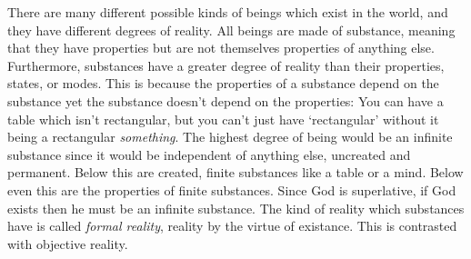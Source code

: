 There are many different possible kinds of beings which exist in the world, and they have different degrees of reality. All beings are made of substance, meaning that they have properties but are not themselves properties of anything else.  Furthermore, substances have a greater degree of reality than their properties, states, or modes. This is because the properties of a substance depend on the substance yet the substance doesn't depend on the properties: You can have a table which isn't rectangular, but you can't just have `rectangular' without it being a rectangular \emph{something}. The highest degree of being would be an infinite substance since it would be independent of anything else, uncreated and permanent. Below this are created, finite substances like a table or a mind. Below even this are the properties of finite substances. Since God is superlative, if God exists then he must be an infinite substance. The kind of reality which substances have is called \emph{formal reality}, reality by the virtue of existance. This is contrasted with objective reality.